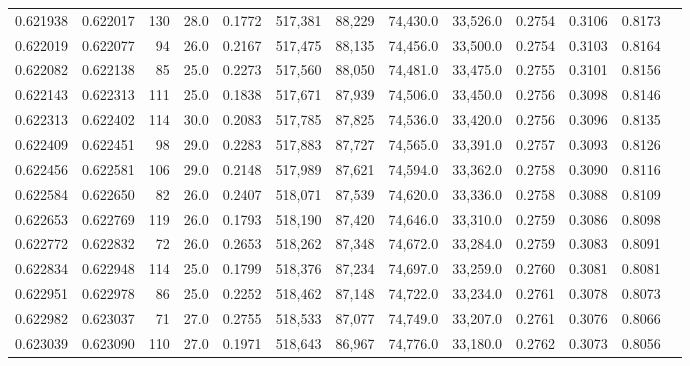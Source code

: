 \begin{tabular}{rrrrrrrrrrrrr}
0.621938 & 0.622017 &   130 & 28.0 &                                     0.1772 & 517,381 &  88,229 &  74,430.0 &  33,526.0 & 0.2754 & 0.3106 & 0.8173 \\
0.622019 & 0.622077 &    94 & 26.0 &                                     0.2167 & 517,475 &  88,135 &  74,456.0 &  33,500.0 & 0.2754 & 0.3103 & 0.8164 \\
0.622082 & 0.622138 &    85 & 25.0 &                                     0.2273 & 517,560 &  88,050 &  74,481.0 &  33,475.0 & 0.2755 & 0.3101 & 0.8156 \\
0.622143 & 0.622313 &   111 & 25.0 &                                     0.1838 & 517,671 &  87,939 &  74,506.0 &  33,450.0 & 0.2756 & 0.3098 & 0.8146 \\
0.622313 & 0.622402 &   114 & 30.0 &                                     0.2083 & 517,785 &  87,825 &  74,536.0 &  33,420.0 & 0.2756 & 0.3096 & 0.8135 \\
0.622409 & 0.622451 &    98 & 29.0 &                                     0.2283 & 517,883 &  87,727 &  74,565.0 &  33,391.0 & 0.2757 & 0.3093 & 0.8126 \\
0.622456 & 0.622581 &   106 & 29.0 &                                     0.2148 & 517,989 &  87,621 &  74,594.0 &  33,362.0 & 0.2758 & 0.3090 & 0.8116 \\
0.622584 & 0.622650 &    82 & 26.0 &                                     0.2407 & 518,071 &  87,539 &  74,620.0 &  33,336.0 & 0.2758 & 0.3088 & 0.8109 \\
0.622653 & 0.622769 &   119 & 26.0 &                                     0.1793 & 518,190 &  87,420 &  74,646.0 &  33,310.0 & 0.2759 & 0.3086 & 0.8098 \\
0.622772 & 0.622832 &    72 & 26.0 &                                     0.2653 & 518,262 &  87,348 &  74,672.0 &  33,284.0 & 0.2759 & 0.3083 & 0.8091 \\
0.622834 & 0.622948 &   114 & 25.0 &                                     0.1799 & 518,376 &  87,234 &  74,697.0 &  33,259.0 & 0.2760 & 0.3081 & 0.8081 \\
0.622951 & 0.622978 &    86 & 25.0 &                                     0.2252 & 518,462 &  87,148 &  74,722.0 &  33,234.0 & 0.2761 & 0.3078 & 0.8073 \\
0.622982 & 0.623037 &    71 & 27.0 &                                     0.2755 & 518,533 &  87,077 &  74,749.0 &  33,207.0 & 0.2761 & 0.3076 & 0.8066 \\
0.623039 & 0.623090 &   110 & 27.0 &                                     0.1971 & 518,643 &  86,967 &  74,776.0 &  33,180.0 & 0.2762 & 0.3073 & 0.8056 \\

\end{tabular}
